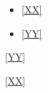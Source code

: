 \documentclass{article}
\begin{document}
\label{XX}

\begin{itemize}
\item{\ref{XX}}
\item{\ref{YY}}
\end{itemize}

\ref{YY}

\ref{XX}
\end{document}
